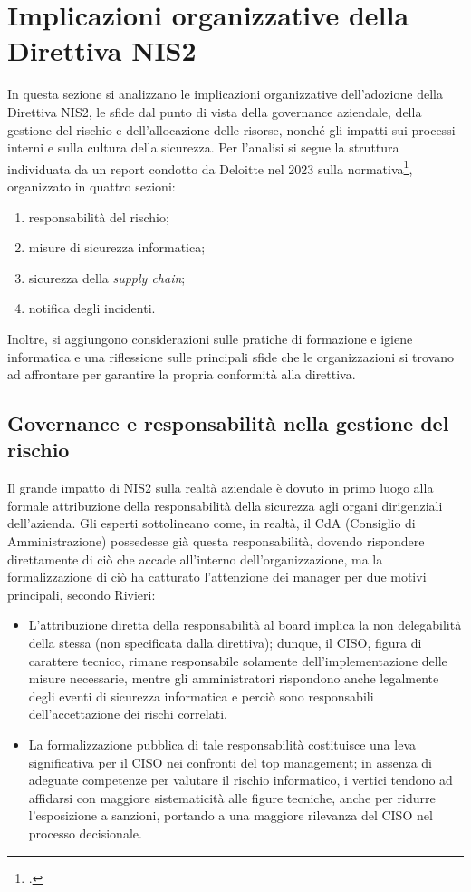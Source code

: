\section{Implicazioni organizzative della Direttiva NIS2}
In questa sezione si analizzano le implicazioni organizzative dell’adozione della Direttiva NIS2, le sfide dal punto di 
vista della governance aziendale, della gestione del rischio e dell’allocazione delle risorse, nonché gli impatti 
sui processi interni e sulla cultura della sicurezza. Per l'analisi si segue la struttura individuata
da un report condotto da Deloitte nel 2023 sulla normativa\footcite{deloitte-nis2}, organizzato in quattro sezioni:
\begin{enumerate}
    \item responsabilità del rischio;
    \item misure di sicurezza informatica;
    \item sicurezza della \textit{supply chain};
    \item notifica degli incidenti.
\end{enumerate}
Inoltre, si aggiungono considerazioni sulle pratiche di formazione e igiene informatica e 
una riflessione sulle principali sfide che le organizzazioni si trovano ad affrontare
per garantire la propria conformità alla direttiva. 


\subsection{Governance e responsabilità nella gestione del rischio}
Il grande impatto di NIS2 sulla realtà aziendale è dovuto in primo luogo alla formale attribuzione della responsabilità
della sicurezza agli organi dirigenziali dell'azienda. Gli esperti sottolineano come, in realtà, il CdA (Consiglio di Amministrazione)
possedesse già questa responsabilità, dovendo rispondere direttamente di ciò che accade all'interno dell'organizzazione, ma 
la formalizzazione di ciò ha catturato l'attenzione dei manager per due motivi principali, secondo Rivieri:
\begin{itemize}
    \item L'attribuzione diretta della responsabilità al board implica la non delegabilità della stessa (non specificata dalla direttiva);
    dunque, il CISO, figura di carattere tecnico, rimane responsabile solamente dell'implementazione delle misure necessarie, mentre
    gli amministratori rispondono anche legalmente degli eventi di sicurezza informatica e perciò sono responsabili dell'accettazione dei rischi correlati.
    \item La formalizzazione pubblica di tale responsabilità costituisce una leva significativa per il CISO nei confronti del top management; in assenza di 
    adeguate competenze per valutare il rischio informatico, i vertici tendono ad affidarsi con maggiore sistematicità alle figure tecniche, anche per 
    ridurre l’esposizione a sanzioni, portando a una maggiore rilevanza del CISO nel processo decisionale.
\end{itemize}

